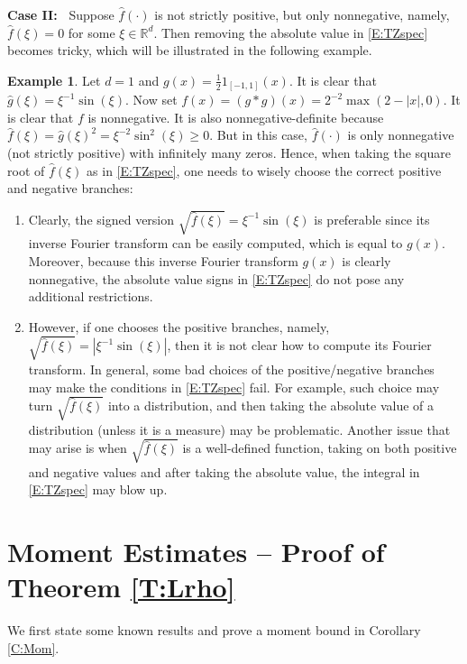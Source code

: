 \documentclass[12pt]{report}
\theoremstyle{plain}
\theoremstyle{definition}
\newtheorem{example}[theorem]{Example}
\numberwithin{equation}{section}
\newcommand{\R}{\mathbb{R}}
\begin{document}
{\bf\noindent Case II:~} Suppose $\widehat{f}(\cdot)$ is not strictly positive, but only nonnegative, namely, $\widehat{f}(\xi)=0$ for some $\xi\in\R^d$. Then removing the absolute value in
\eqref{E:TZspec} becomes tricky, which will be illustrated in the following example.

\begin{example} \label{Ex:sqrt}
	Let $d=1$ and $g(x)=\frac{1}{2}1_{[-1,1]}(x)$. It is clear that $ \widehat{g}(\xi) =
	\xi^{-1}\sin(\xi)$. Now set $f(x) = \left(g*g\right)(x) = 2^{-2}\max(2-|x|,0)$. It is clear that $f$
	is nonnegative. It is also nonnegative-definite because $\widehat{f}(\xi)= \widehat{g}(\xi)^2=
	\xi^{-2}\sin^2(\xi)\ge 0$. But in this case, $\widehat{f}(\cdot)$ is only nonnegative (not
	strictly positive) with infinitely many zeros. Hence, when taking the square root of
	$\widehat{f}(\xi)$ as in \eqref{E:TZspec}, one needs to wisely choose the correct positive and
	negative branches:
	\begin{enumerate}
		\item Clearly, the signed version $\sqrt{\widehat{f}(\xi)}=\xi^{-1}\sin(\xi)$ is preferable
		since its inverse Fourier transform can be easily computed, which is equal to $g(x)$.
		Moreover, because this inverse Fourier transform $g(x)$ is clearly nonnegative, the absolute
		value signs in \eqref{E:TZspec} do not pose any additional restrictions.
		\item However, if one chooses the positive branches, namely,
		$\sqrt{\widehat{f}(\xi)}=\left|\xi^{-1}\sin(\xi)\right|$, then it is not clear how to compute its
		Fourier transform. In general, some bad choices of the positive/negative branches may make the
		conditions in \eqref{E:TZspec} fail. For example, such choice may turn
		$\sqrt{\widehat{f}(\xi)}$ into a distribution, and then taking the absolute value of a
		distribution (unless it is a measure) may be problematic. Another issue that may arise is when $\sqrt{\widehat{f}(\xi)}$ is a well-defined function, taking on both positive and negative values and after taking the absolute value, the integral in \eqref{E:TZspec} may blow up. 
	\end{enumerate}
\end{example}

\section{Moment Estimates -- Proof of Theorem \ref{T:Lrho}} \label{S:Lrho}
We first state some known results and prove a moment bound in Corollary \ref{C:Mom}.
\end{document}
